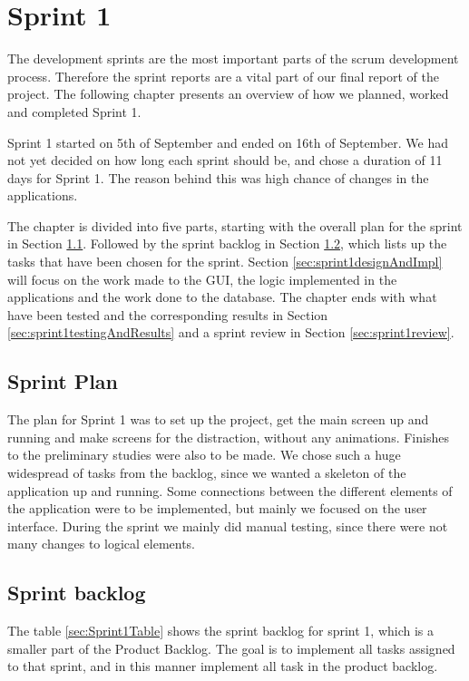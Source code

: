 \chapter{Sprint 1}
\label{chap:sprint1}
The development sprints are the most important parts of the scrum development process.
Therefore the sprint reports are a vital part of our final report of the project. The
following chapter presents an overview of how we planned, worked and completed Sprint 1.

Sprint 1 started on 5th of September and ended on 16th of September.
We had not yet decided on how long each sprint should be, and chose a duration of 11 days 
for Sprint 1. The reason behind this was high chance of changes in the applications.

The chapter is divided into five parts, starting with the overall plan for the sprint
in Section \ref{sec:sprint1plan}. Followed by the sprint backlog in Section 
\ref{sec:sprint1backlog}, which lists up the tasks that have been chosen for the sprint. 
Section \ref{sec:sprint1designAndImpl} will focus on the work made to the GUI, the logic 
implemented in the applications and the work done to the database. The chapter ends with 
what have been tested and the corresponding results in Section 
\ref{sec:sprint1testingAndResults} and a sprint review in Section \ref{sec:sprint1review}.

\section{Sprint Plan}
\label{sec:sprint1plan}
The plan for Sprint 1 was to set up the project, get the main screen up and running and
make screens for the distraction, without any animations. Finishes to the preliminary
studies were also to be made. We chose such a huge widespread of tasks from the backlog, since we wanted a skeleton of the application up and running.
Some connections between the different elements of the application were to be implemented,
but mainly we focused on the user interface. During the sprint we mainly did manual
testing, since there were not many changes to logical elements.

\section{Sprint backlog}
\label{sec:sprint1backlog}
The table \ref{sec:Sprint1Table} shows the sprint backlog for sprint 1, which is a smaller part of the
Product Backlog. The goal is to implement all tasks assigned to that sprint, and in this manner implement all task in the product backlog.

